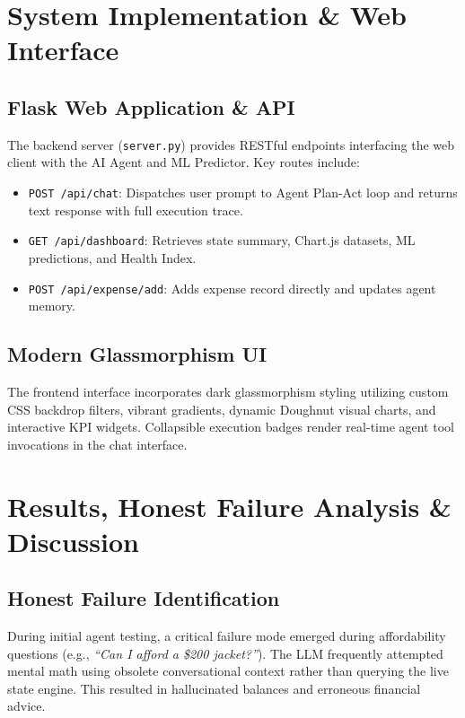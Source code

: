 \documentclass[12pt,a4paper,oneside]{report}
\begin{document}
\chapter{System Implementation \& Web Interface}
\label{chap:impl}

\section{Flask Web Application \& API}
The backend server (\texttt{server.py}) provides RESTful endpoints interfacing the web client with the AI Agent and ML Predictor. Key routes include:
\begin{itemize}
    \item \texttt{POST /api/chat}: Dispatches user prompt to Agent Plan-Act loop and returns text response with full execution trace.
    \item \texttt{GET /api/dashboard}: Retrieves state summary, Chart.js datasets, ML predictions, and Health Index.
    \item \texttt{POST /api/expense/add}: Adds expense record directly and updates agent memory.
\end{itemize}

\section{Modern Glassmorphism UI}
The frontend interface incorporates dark glassmorphism styling utilizing custom CSS backdrop filters, vibrant gradients, dynamic Doughnut visual charts, and interactive KPI widgets. Collapsible execution badges render real-time agent tool invocations in the chat interface.

\chapter{Results, Honest Failure Analysis \& Discussion}
\label{chap:results}

\section{Honest Failure Identification}
During initial agent testing, a critical failure mode emerged during affordability questions (e.g., \textit{``Can I afford a \$200 jacket?''}). The LLM frequently attempted mental math using obsolete conversational context rather than querying the live state engine. This resulted in hallucinated balances and erroneous financial advice.
\end{document}
